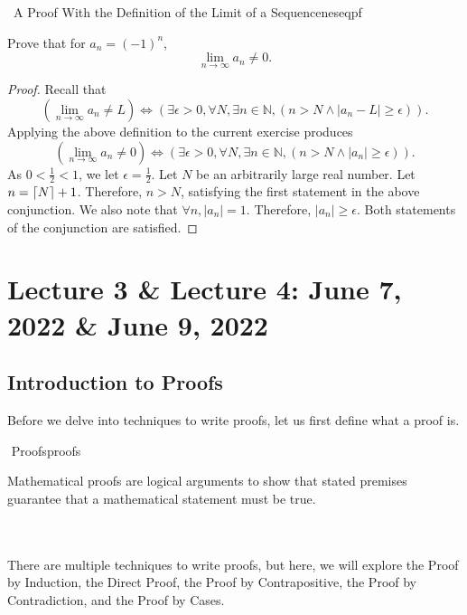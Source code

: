         \begin{exercise}{\Difficulty\,\Difficulty\,\,A Proof With the Definition of the Limit of a Sequence}{neseqpf}
        
            Prove that for \(a_n=(-1)^n\),
            \begin{equation*}
                \lim_{n\to\infty}a_n\neq 0.
            \end{equation*}
            \begin{proof}
            Recall that
            \begin{equation*}
                \left(\lim_{n\to\infty}a_n\neq L\right)\iff(\exists \epsilon >0,\forall N,\exists n \in\mathbb{N},(n>N\wedge|a_n-L|\geq\epsilon)).
            \end{equation*}
            Applying the above definition to the current exercise produces
            \begin{equation*}
                \left(\lim_{n\to\infty}a_n\neq 0\right)\iff(\exists \epsilon > 0,\forall N,\exists n \in\mathbb{N},(n>N\wedge|a_n|\geq\epsilon)).
            \end{equation*}
            As \(0<\frac{1}{2}<1\), we let \(\epsilon=\frac{1}{2}\). Let \(N\) be an arbitrarily large real number. Let \(n=\lceil N\rceil+1\). Therefore, \(n>N\), satisfying the first statement in the above conjunction. We also note that \(\forall n,|a_n|=1\). Therefore, \(|a_n|\geq\epsilon\). Both statements of the conjunction are satisfied.
            \end{proof}
        \end{exercise}
        \pagebreak
        
\section{Lecture 3 \& Lecture 4: June 7, 2022 \& June 9, 2022}
        
    \subsection{Introduction to Proofs}
    
        Before we delve into techniques to write proofs, let us first define what a proof is. 
        \begin{definition}{\Stop\,\,Proofs}{proofs}
        
            Mathematical proofs are logical arguments to show that stated premises guarantee that a mathematical statement must be true.
        
        \end{definition}
        \vphantom
        \\
        \\
        There are multiple techniques to write proofs, but here, we will explore the Proof by Induction, the Direct Proof, the Proof by Contrapositive, the Proof by Contradiction, and the Proof by Cases.
        

